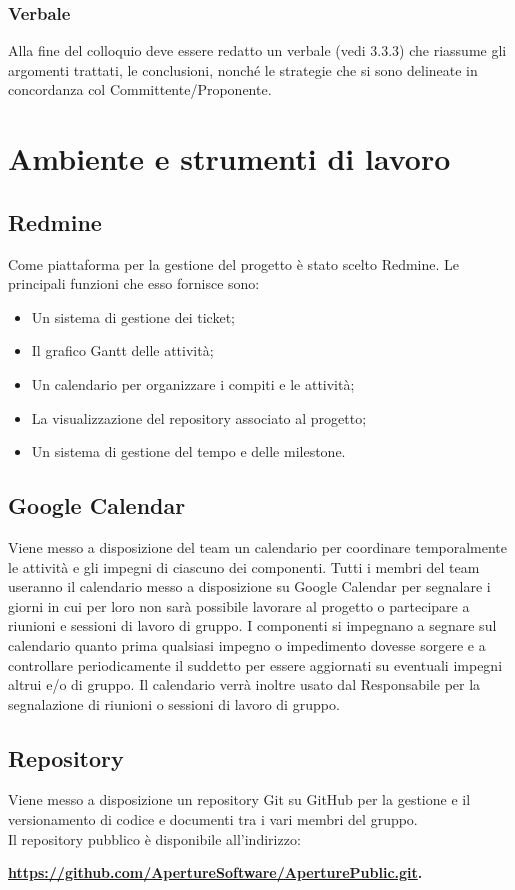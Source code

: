 \subsubsection{Verbale}
\label{3.4.3}
Alla fine del colloquio deve essere redatto un verbale (vedi 3.3.3) che riassume gli argomenti trattati, le conclusioni, nonché le strategie che si sono delineate in concordanza col Committente/Proponente.

\newpage
\section{Ambiente e strumenti di lavoro}
\label{4.0}

\subsection{Redmine}
\label{4.1}
Come piattaforma per la gestione del progetto è stato scelto Redmine. Le principali funzioni che esso fornisce sono:
\begin{itemize}
\item Un sistema di gestione dei ticket;
\item Il grafico Gantt delle attività;
\item Un calendario per organizzare i compiti e le attività;
\item La visualizzazione del repository associato al progetto;
\item Un sistema di  gestione del tempo e delle milestone.
\end{itemize}

\subsection{Google Calendar}
\label{4.2}
Viene messo a disposizione del team un calendario per coordinare temporalmente le attività e gli impegni di ciascuno dei componenti.
Tutti i membri del team useranno il calendario messo a disposizione su Google Calendar per segnalare i giorni in cui per loro non sarà possibile lavorare al progetto o partecipare a riunioni e sessioni di lavoro di gruppo. I componenti si impegnano a segnare sul calendario quanto prima qualsiasi impegno o impedimento dovesse sorgere e a controllare periodicamente il suddetto per essere aggiornati su eventuali impegni altrui e/o di gruppo.
Il calendario verrà inoltre usato dal Responsabile per la segnalazione di riunioni o sessioni di lavoro di gruppo.

\subsection{Repository}
\label{4.3}
Viene messo a disposizione un repository Git su GitHub per la gestione e il versionamento di codice e documenti tra i vari membri del gruppo.\\
Il repository pubblico è disponibile all'indirizzo: \\
\begin{center}
\textbf{\url{https://github.com/ApertureSoftware/AperturePublic.git}.}
\end{center}

